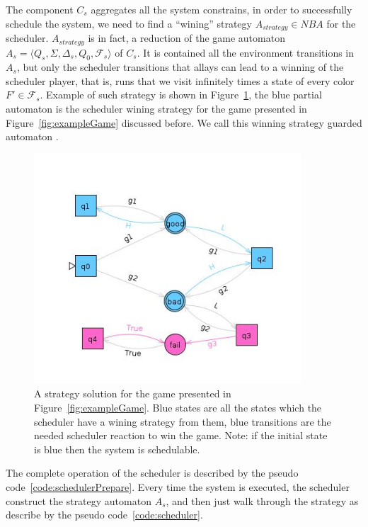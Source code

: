 \documentclass[ twoside, 12pt ]{article}
\begin{document}
The component $C_s$ aggregates all the system constrains, in order to successfully schedule the system, we need to find a ``wining'' strategy $A_{strategy} \in NBA$ for the scheduler.
$A_{strategy}$ is in fact, a reduction of the game automaton $A_s = \langle Q_s ,\Sigma,\Delta_s, Q_0, \mathcal{F}_s \rangle$ of $C_s$. It is contained all the environment transitions in $A_s$, but only the scheduler transitions that allays can lead to a winning of the scheduler player, that is, runs that we visit infinitely times a state of every color $F' \in \mathcal{F}_s$.
Example of such strategy is shown in Figure~\ref{fig:exampleGameStrategy}, the blue partial automaton is the scheduler wining strategy for the game presented in Figure~\ref{fig:exampleGame} discussed before.
We call this winning strategy guarded automaton .

\begin{figure}[h]
    \centerline{\includegraphics[width=100mm]{gameExampleSolved.jpg}}
    \caption{A strategy solution for the game presented in Figure~\ref{fig:exampleGame}.
        Blue states are all the states which the scheduler have a wining strategy from them, blue transitions are the needed scheduler reaction to win the game.
        Note: if the initial state is blue then the system is schedulable.}
    \label{fig:exampleGameStrategy}
\end{figure}

The complete operation of the scheduler is described by the pseudo code~\ref{code:schedulerPrepare}.
Every time the system is executed, the scheduler construct the strategy automaton $A_s$, and then just walk through the strategy as describe by the pseudo code~\ref{code:scheduler}. 
\end{document}
